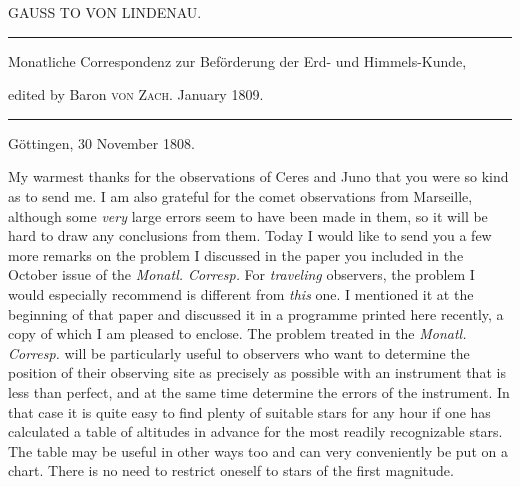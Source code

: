 \clearpage{}%
\begin{center}
{\small GAUSS TO VON LINDENAU.\par}
\medskip\hrule\medskip
{\small Monatliche Correspondenz zur Beförderung der Erd- und Himmels-Kunde,\par
edited by Baron \textsc{von Zach}. January 1809.\par}
\medskip\hrule
\end{center}\medskip
\begin{flushright}Göttingen, 30 November 1808.\end{flushright}
My warmest thanks for the observations of Ceres and Juno that you were so kind as to send me. I am also grateful for the comet observations from Marseille, although some \emph{very} large errors seem to have been made in them, so it will be hard to draw any conclusions from them. Today I would like to send you a few more remarks on the problem I discussed in the paper you included in the October issue of the \emph{Monatl. Corresp.} For \emph{traveling} observers, the problem I would especially recommend is different from \emph{this} one. I mentioned it at the beginning of that paper and discussed it in a programme printed here recently, a copy of which I am pleased to enclose. The problem treated in the \emph{Monatl. Corresp.} will be particularly useful to observers who want to determine the position of their observing site as precisely as possible with an instrument that is less than perfect, and at the same time determine the errors of the instrument. In that case it is quite easy to find plenty of suitable stars for any hour if one has calculated a table of altitudes in advance for the most readily recognizable stars. The table may be useful in other ways too and can very conveniently be put on a chart. There is no need to restrict oneself to stars of the first magnitude.
%
